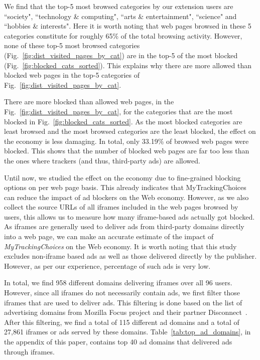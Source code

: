 \documentclass[conference]{IEEEtran}
\begin{document}
We find that the top-5 most browsed categories by our extension users are ``society", ``technology \& computing", ``arts \& entertainment", ``science" and ``hobbies \& interests".
Here it is worth noting that web pages browsed in these 5 categories constitute for roughly 65\% of the total browsing activity.
However, none of these top-5 most browsed categories (Fig.~\ref{fig:dist_visited_pages_by_cat}) are in the top-5 of the most blocked (Fig.~\ref{fig:blocked_cats_sorted}).
This explains why there are more allowed than blocked web pages in the top-5 categories of Fig.~\ref{fig:dist_visited_pages_by_cat}.

There are more blocked than allowed web pages,  in the Fig.~\ref{fig:dist_visited_pages_by_cat}, for the categories that are the most blocked in Fig.~\ref{fig:blocked_cats_sorted}.
As the most blocked categories are least browsed and the most browsed categories are the least blocked, the effect on the economy is less damaging.
In total, only 33.19\% of browsed web pages were blocked.
This shows that the number of blocked web pages are far too less than the ones where trackers (and thus, third-party ads) are allowed.



Until now, we studied the effect on the economy due to fine-grained blocking options on per web page basis.
This already indicates that MyTrackingChoices can reduce the impact of ad blockers on the Web economy.
However, as we also collect the source URLs of all iframes included in the web pages browsed by users, this allows us to measure how many iframe-based ads actually got blocked.
As iframes are generally used to deliver ads from third-party domains directly into a web page, we can make an accurate estimate of the impact of \emph{MyTrackingChoices} on the Web economy.
It is worth noting that this study excludes non-iframe based ads as well as those delivered directly by the publisher.
However, as per our experience, percentage of such ads is very low. 

In total, we find 958 different domains delivering iframes over all 96 users.
However, since all iframes do not necessarily contain ads, we first filter those iframes that are used to deliver ads.
This filtering is done based on the list of advertising domains from Mozilla Focus project and their partner Disconnect~\cite{disconnect_ad_domains}.
After this filtering, we find a total of 115 different ad domains and a total of 27,861 iframes or ads served by these domains.
Table~\ref{tab:top_ad_domains}, in the appendix of this paper, contains top 40 ad domains that delivered ads through iframes.
\end{document}
